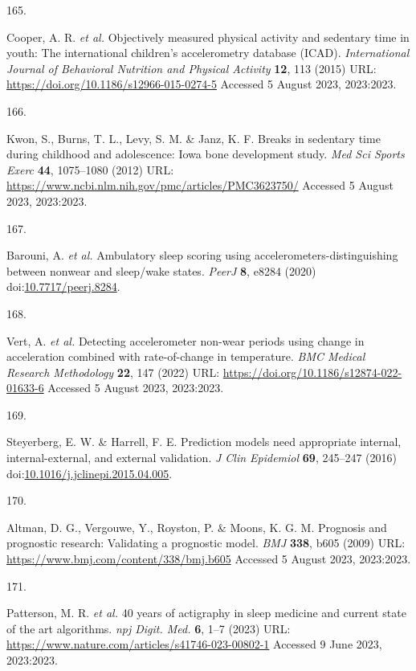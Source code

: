 \documentclass[
  10pt,
]{scrbook}
\newlength{\cslhangindent}
\newlength{\csllabelwidth}
\newlength{\cslentryspacingunit} %
\newenvironment{CSLReferences}[2] %
 {%
  \setlength{\parindent}{0pt}
  \ifodd #1
  \let\oldpar\par
  \def\par{\hangindent=\cslhangindent\oldpar}
  \fi
  \setlength{\parskip}{#2\cslentryspacingunit}
 }%
 {}
\newcommand{\CSLLeftMargin}[1]{\parbox[t]{\csllabelwidth}{#1}}
\newcommand{\CSLRightInline}[1]{\parbox[t]{\linewidth - \csllabelwidth}{#1}\break}
\let\originaltextbf\textbf
\renewcommand{\textbf}[1]{\textcolor{color1}{\originaltextbf{#1}}}
\begin{document}
\begin{CSLReferences}{0}{0}
\leavevmode{}%
\CSLLeftMargin{165. }%
\CSLRightInline{Cooper, A. R. \emph{et al.} Objectively measured
physical activity and sedentary time in youth: The international
children's accelerometry database ({ICAD}). \emph{International Journal
of Behavioral Nutrition and Physical Activity} \textbf{12}, 113 (2015)
URL: \url{https://doi.org/10.1186/s12966-015-0274-5} Accessed 5 August
2023, 2023:2023.}

\leavevmode{}%
\CSLLeftMargin{166. }%
\CSLRightInline{Kwon, S., Burns, T. L., Levy, S. M. \& Janz, K. F.
Breaks in sedentary time during childhood and adolescence: Iowa bone
development study. \emph{Med Sci Sports Exerc} \textbf{44}, 1075--1080
(2012) URL: \url{https://www.ncbi.nlm.nih.gov/pmc/articles/PMC3623750/}
Accessed 5 August 2023, 2023:2023.}

\leavevmode{}%
\CSLLeftMargin{167. }%
\CSLRightInline{Barouni, A. \emph{et al.} Ambulatory sleep scoring using
accelerometers-distinguishing between nonwear and sleep/wake states.
\emph{{PeerJ}} \textbf{8}, e8284 (2020)
doi:\href{https://doi.org/10.7717/peerj.8284}{10.7717/peerj.8284}.}

\leavevmode{}%
\CSLLeftMargin{168. }%
\CSLRightInline{Vert, A. \emph{et al.} Detecting accelerometer non-wear
periods using change in acceleration combined with rate-of-change in
temperature. \emph{{BMC} Medical Research Methodology} \textbf{22}, 147
(2022) URL: \url{https://doi.org/10.1186/s12874-022-01633-6} Accessed 5
August 2023, 2023:2023.}

\leavevmode{}%
\CSLLeftMargin{169. }%
\CSLRightInline{Steyerberg, E. W. \& Harrell, F. E. Prediction models
need appropriate internal, internal-external, and external validation.
\emph{J Clin Epidemiol} \textbf{69}, 245--247 (2016)
doi:\href{https://doi.org/10.1016/j.jclinepi.2015.04.005}{10.1016/j.jclinepi.2015.04.005}.}

\leavevmode{}%
\CSLLeftMargin{170. }%
\CSLRightInline{Altman, D. G., Vergouwe, Y., Royston, P. \& Moons, K. G.
M. Prognosis and prognostic research: Validating a prognostic model.
\emph{{BMJ}} \textbf{338}, b605 (2009) URL:
\url{https://www.bmj.com/content/338/bmj.b605} Accessed 5 August 2023,
2023:2023.}

\leavevmode{}%
\CSLLeftMargin{171. }%
\CSLRightInline{Patterson, M. R. \emph{et al.} 40 years of actigraphy in
sleep medicine and current state of the art algorithms. \emph{npj Digit.
Med.} \textbf{6}, 1--7 (2023) URL:
\url{https://www.nature.com/articles/s41746-023-00802-1} Accessed 9 June
2023, 2023:2023.}


\end{CSLReferences}
\end{document}

